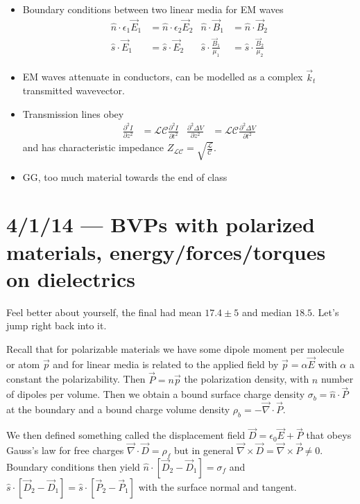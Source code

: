 \documentclass[10pt]{report}
\newcommand{\ptd}[2]{\frac{\partial^2 #1}{\partial#2^2}}
\begin{document}
\begin{itemize}
    \item Boundary conditions between two linear media for EM waves
        \begin{align}
            \hat{n} \cdot \epsilon_1 \vec{E}_1 &= \hat{n} \cdot \epsilon_2 \vec{E}_2 & \hat{n} \cdot \vec{B}_1 &= \hat{n}\cdot \vec{B}_2\\
            \hat{s} \cdot \vec{E}_1 &= \hat{s} \cdot \vec{E}_2 & \hat{s} \cdot \frac{\vec{B}_1}{\mu_1} &= \hat{s} \cdot \frac{\vec{B}_2}{\mu_2}
        \end{align}
    \item EM waves attenuate in conductors, can be modelled as a complex $\vec{k}_t$ transmitted wavevector. 
    \item Transmission lines obey
        \begin{align}
            \ptd{I}{z} &= \mathcal{L}\mathcal{C}\ptd{I}{t} & \ptd{\Delta V}{z} &= \mathcal{LC}\ptd{\Delta V}{t}
        \end{align}
        and has characteristic impedance $Z_{\mathcal{LC}} = \sqrt{\frac{\mathcal{L}}{\mathcal{C}}}$.
    \item GG, too much material towards the end of class
\end{itemize}

\chapter{4/1/14 --- BVPs with polarized materials, energy/forces/torques on dielectrics}

Feel better about yourself, the final had mean $17.4 \pm 5$ and median $18.5$. Let's jump right back into it.

Recall that for polarizable materials we have some dipole moment per molecule or atom $\vec{p}$ and for linear media is related to the applied field by $\vec{p} = \alpha \vec{E}$ with $\alpha$ a constant the polarizability. Then $\vec{P} = n\vec{p}$ the polarization density, with $n$ number of dipoles per volume. Then we obtain a bound surface charge density $\sigma_b = \hat{n}\cdot \vec{P}$ at the boundary and a bound charge volume density $\rho_b = -\vec{\nabla}\cdot \vec{P}$. 

We then defined something called the displacement field $\vec{D} = \epsilon_0\vec{E} + \vec{P}$ that obeys Gauss's law for free charges $\vec{\nabla}\cdot \vec{D} = \rho_f$ but in general $\vec{\nabla}\times\vec{D} = \vec{\nabla}\times\vec{P} \neq 0$. Boundary conditions then yield $\hat{n}\cdot[\vec{D}_2 - \vec{D}_1] = \sigma_f$ and $\hat{s} \cdot [\vec{D}_2 - \vec{D}_1] =\hat{s} \cdot [\vec{P}_2 - \vec{P}_1]$ with the surface normal and tangent.
\end{document}
